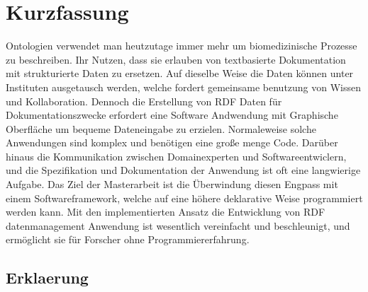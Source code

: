 \chapter*{Kurzfassung}

Ontologien verwendet man heutzutage immer mehr um biomedizinische Prozesse zu beschreiben. Ihr Nutzen, dass sie erlauben von textbasierte Dokumentation mit strukturierte Daten zu ersetzen. Auf dieselbe Weise die Daten können unter Instituten ausgetausch werden, welche fordert gemeinsame benutzung von Wissen und Kollaboration. Dennoch die Erstellung von RDF Daten für Dokumentationszwecke erfordert eine Software Andwendung mit Graphische Oberfläche um bequeme Dateneingabe zu erzielen. Normaleweise solche Anwendungen sind komplex und benötigen eine große menge Code. Darüber hinaus die Kommunikation zwischen Domainexperten und Softwareentwiclern, und die Spezifikation und Dokumentation der Anwendung ist oft eine langwierige Aufgabe. Das Ziel der Masterarbeit ist die Überwindung diesen Engpass mit einem Softwareframework, welche auf eine höhere deklarative Weise programmiert werden kann. Mit den implementierten Ansatz die Entwicklung von RDF datenmanagement Anwendung ist wesentlich vereinfacht und beschleunigt, und ermöglicht sie für Forscher ohne Programmiererfahrung. 

\linespread{1.25}\selectfont

\tableofcontents %
\listoffigures  %
\listoftables
\blankpage
\blankpage






%

\blankpage

\begin{appendices}
\end{appendices}

\pagestyle{empty}
\newpage
\section*{Erklaerung}

